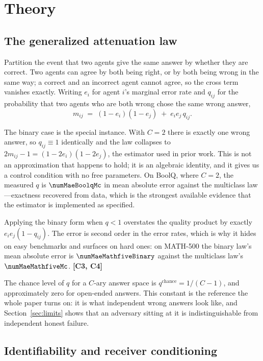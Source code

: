 \section{Theory}
\label{sec:theory}

\subsection{The generalized attenuation law}

Partition the event that two agents give the same answer by whether they are
correct. Two agents can agree by both being right, or by both being wrong in the
same way; a correct and an incorrect agent cannot agree, so the cross term
vanishes exactly. Writing $e_i$ for agent $i$'s marginal error rate and $q_{ij}$
for the probability that two agents who are both wrong chose the same wrong
answer,
\[
  m_{ij} \;=\; (1-e_i)(1-e_j) \;+\; e_i e_j\, q_{ij}.
\]

The binary case is the special instance. With $C=2$ there is exactly one wrong
answer, so $q_{ij} \equiv 1$ identically and the law collapses to
$2m_{ij}-1 = (1-2e_i)(1-2e_j)$, the estimator used in prior work. This is not an
approximation that happens to hold; it is an algebraic identity, and it gives us
a control condition with no free parameters. On BoolQ, where $C=2$, the measured
$q$ is $\numMaeBoolqMc$ in mean absolute error against the multiclass
law---exactness recovered from data, which is the strongest available evidence
that the estimator is implemented as specified.

Applying the binary form when $q < 1$ overstates the quality product by exactly
$e_i e_j (1 - q_{ij})$. The error is second order in the error rates, which is
why it hides on easy benchmarks and surfaces on hard ones: on MATH-500 the binary
law's mean absolute error is $\numMaeMathfiveBinary$ against the multiclass law's
$\numMaeMathfiveMc$. \textbf{[C3, C4]}

The chance level of $q$ for a $C$-ary answer space is $q^{\mathrm{chance}} =
1/(C-1)$, and approximately zero for open-ended answers. This constant is the
reference the whole paper turns on: it is what independent wrong answers look
like, and Section~\ref{sec:limits} shows that an adversary sitting at it is
indistinguishable from independent honest failure.

\subsection{Identifiability and receiver conditioning}

